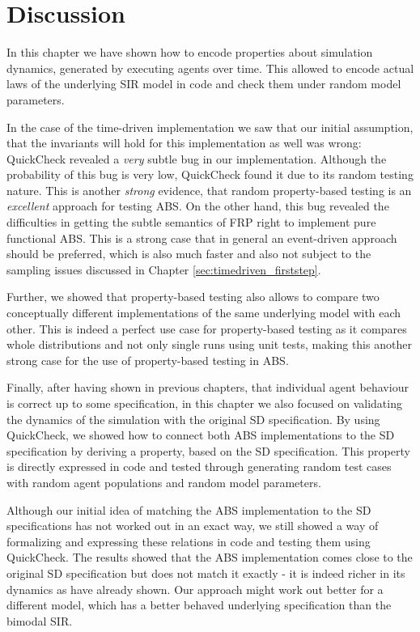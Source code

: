 \section{Discussion}
In this chapter we have shown how to encode properties about simulation dynamics, generated by executing agents over time. This allowed to encode actual laws of the underlying SIR model in code and check them under random model parameters.

In the case of the time-driven implementation we saw that our initial assumption, that the invariants will hold for this implementation as well was wrong: QuickCheck revealed a \textit{very} subtle bug in our implementation. Although the probability of this bug is very low, QuickCheck found it due to its random testing nature. This is another \textit{strong} evidence, that random property-based testing is an \textit{excellent} approach for testing ABS. On the other hand, this bug revealed the difficulties in getting the subtle semantics of FRP right to implement pure functional ABS. This is a strong case that in general an event-driven approach should be preferred, which is also much faster and also not subject to the sampling issues discussed in Chapter \ref{sec:timedriven_firststep}.

Further, we showed that property-based testing also allows to compare two conceptually different implementations of the same underlying model with each other. This is indeed a perfect use case for property-based testing as it compares whole distributions and not only single runs using unit tests, making this another strong case for the use of property-based testing in ABS.

Finally, after having shown in previous chapters, that individual agent behaviour is correct up to some specification, in this chapter we also focused on validating the dynamics of the simulation with the original SD specification. By using QuickCheck, we showed how to connect both ABS implementations to the SD specification by deriving a property, based on the SD specification. This property is directly expressed in code and tested through generating random test cases with random agent populations and random model parameters. 

Although our initial idea of matching the ABS implementation to the SD specifications has not worked out in an exact way, we still showed a way of formalizing and expressing these relations in code and testing them using \\ QuickCheck. The results showed that the ABS implementation comes close to the original SD specification but does not match it exactly - it is indeed richer in its dynamics as \cite{figueredo_comparing_2014,macal_agent-based_2010} have already shown. Our approach might work out better for a different model, which has a better behaved underlying specification than the bimodal SIR.
